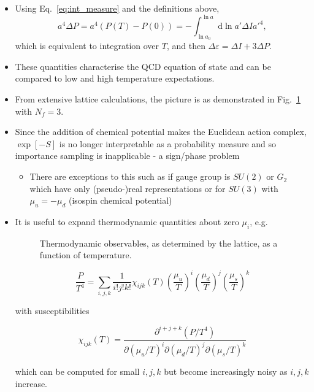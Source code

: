 \begin{itemize}
    \item Using Eq.~\eqref{eq:int_measure} and the definitions above, 
\begin{equation}
    a^4 \Delta P = a^4(P(T) - P(0)) = - \int_{\ln a_0}^{\ln a}\text{d} \ln a' \Delta I a'^4,
\end{equation}
which is equivalent to integration over $T$, and then $\Delta \varepsilon = \Delta I + 3 \Delta P$.
    \item These quantities characterise the QCD equation of state and can be compared to low and high temperature expectations.
    \item From extensive lattice calculations, the picture is as demonstrated in Fig.~\ref{fig:thermo} with $N_f = 3$.
    \item Since the addition of chemical potential makes the Euclidean action complex, $\exp[-S]$ is no longer interpretable as a probability measure and so importance sampling is inapplicable - a sign/phase problem
    \begin{itemize}
        \item There are exceptions to this such as if gauge group is $SU(2)$ or $G_2$ which have only (pseudo-)real representations or for $SU(3)$ with $\mu_u = - \mu_d$ (isospin chemical potential)
    \end{itemize}
    \item It is useful to expand thermodynamic quantities about zero $\mu_i$, e.g.
\begin{figure}
\caption{Thermodynamic observables, as determined by the lattice, as a function of temperature.
\label{fig:thermo}
}
\end{figure}

\begin{equation}
\frac{P}{T^{4}}=\sum_{i, j, k} \frac{1}{i!j!k!} \chi_{i j k}(T)\left(\frac{\mu_{u}}{T}\right)^{i}\left(\frac{\mu_{d}}{T}\right)^{j}\left(\frac{\mu_{s}}{T}\right)^{k}
\end{equation}

with susceptibilities

\begin{equation}
\chi_{ijk}(T)=\frac{\partial^{i+j+k}(P/T^4)}{\partial(\mu_u/T)^i \partial(\mu_d/T)^j \partial(\mu_s/T)^k}
\end{equation}

which can be computed for small \(i,j,k\) but become increasingly noisy as $i,j,k$ increase.
\end{itemize}


